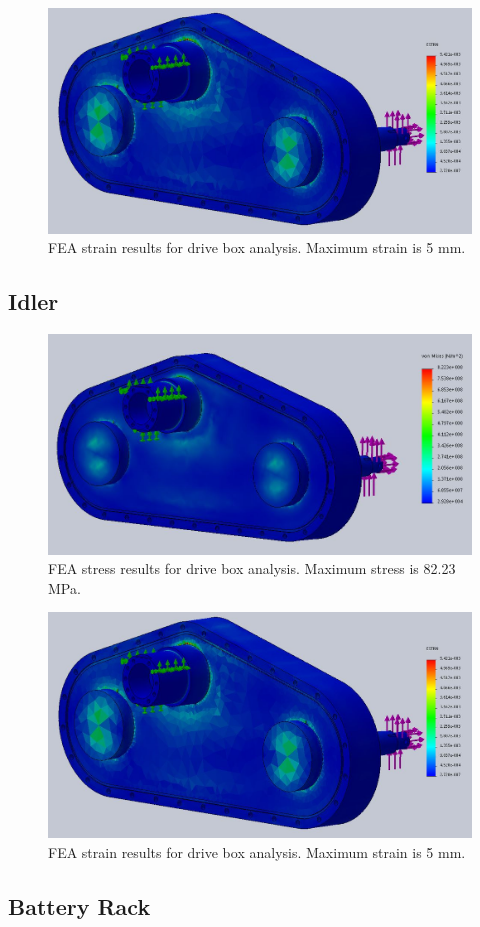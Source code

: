 \begin{figure}[htbp]
\centering
\includegraphics[width=\textwidth]{images/drive_box_strain_fea}
\caption[Drive Box FEA Strain Results]{FEA strain results for drive box analysis. Maximum strain is 5 mm.}
\label{fig:box_fea2}
\end{figure}

\subsection{Idler}

\begin{figure}[htbp]
\centering
\includegraphics[width=\textwidth]{images/drive_box_stress_fea}
\caption[Idler FEA Stress Results]{FEA stress results for drive box analysis. Maximum stress is 82.23 MPa.}
\label{fig:idler_fea1}
\end{figure}

\begin{figure}[htbp]
\centering
\includegraphics[width=\textwidth]{images/drive_box_strain_fea}
\caption[Idler FEA Strain Results]{FEA strain results for drive box analysis. Maximum strain is 5 mm.}
\label{fig:idler_fea2}
\end{figure}

\subsection{Battery Rack}\label{br_fea}